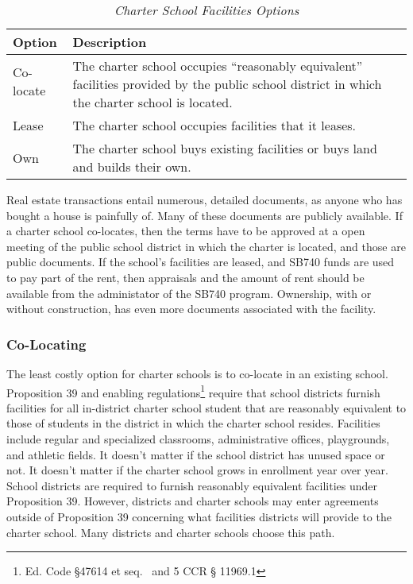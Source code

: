 \begin{table}[ht]
  \small%
  \caption[Charter School Facilities Options]{\textit{Charter School Facilities Options}}\label{tab:charter-facilities-options}%
  \begin{tabular}{ll}
    \toprule%
    Option    & Description \\
    \midrule%
    Co-locate & \multirow[t]{2}{4.75in}{The charter school occupies ``reasonably equivalent'' facilities provided by 
                the public school district in which the charter school is located.}\\
                \\
    Lease     & The charter school occupies facilities that it leases.\\
    Own       & The charter school buys existing facilities or buys land and builds their own. \\
    \bottomrule%
  \end{tabular}
\end{table}

Real estate transactions entail numerous, detailed documents, as anyone who has bought a house is painfully of. Many of these documents are publicly available. If a charter school co-locates, then the terms have to be approved at a open meeting of the public school district in which the charter is located, and those are public documents. If the school's facilities are leased, and SB740 funds are used to pay part of the rent, then appraisals and the amount of rent should be available from the administator of the SB740 program. Ownership, with or without construction, has even more documents associated with the facility.

\subsubsection{Co-Locating}\label{sec:co-locating}\indent

The least costly option for charter schools is to co-locate in an existing school. Proposition 39 and enabling regulations\footnote{Ed. Code §47614 et seq.  and 5 CCR § 11969.1} require that school districts furnish facilities for all in-district charter school student that are reasonably equivalent to those of students in the district in which the charter school resides. Facilities include regular and specialized classrooms, administrative offices, playgrounds, and athletic fields. It doesn't matter if the school district has unused space or not. It doesn't matter if the charter school grows in enrollment year over year. School districts are required to furnish reasonably equivalent facilities under Proposition 39. However, districts and charter schools may enter agreements outside of Proposition 39 concerning what facilities districts will provide to the charter school. Many districts and charter schools choose this path.

